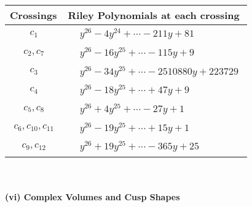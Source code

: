\documentclass[1p]{elsarticle_modified}
\theoremstyle{definition}
\begin{document}
\begin{tabular}{m{50pt}|m{274pt}}
Crossings & \hspace{64pt}Riley Polynomials at each crossing \\
\hline $$\begin{aligned}c_{1}\end{aligned}$$&$\begin{aligned}
&y^{26}-4 y^{24}+\cdots-211 y+81
\end{aligned}$\\
\hline $$\begin{aligned}c_{2},c_{7}\end{aligned}$$&$\begin{aligned}
&y^{26}-16 y^{25}+\cdots-115 y+9
\end{aligned}$\\
\hline $$\begin{aligned}c_{3}\end{aligned}$$&$\begin{aligned}
&y^{26}-34 y^{25}+\cdots-2510880 y+223729
\end{aligned}$\\
\hline $$\begin{aligned}c_{4}\end{aligned}$$&$\begin{aligned}
&y^{26}-18 y^{25}+\cdots+47 y+9
\end{aligned}$\\
\hline $$\begin{aligned}c_{5},c_{8}\end{aligned}$$&$\begin{aligned}
&y^{26}+4 y^{25}+\cdots-27 y+1
\end{aligned}$\\
\hline $$\begin{aligned}c_{6},c_{10},c_{11}\end{aligned}$$&$\begin{aligned}
&y^{26}-19 y^{25}+\cdots+15 y+1
\end{aligned}$\\
\hline $$\begin{aligned}c_{9},c_{12}\end{aligned}$$&$\begin{aligned}
&y^{26}+19 y^{25}+\cdots-365 y+25
\end{aligned}$\\
\hline
\end{tabular}\\~\\
\newpage\flushleft \textbf{(vi) Complex Volumes and Cusp Shapes}
\end{document}
